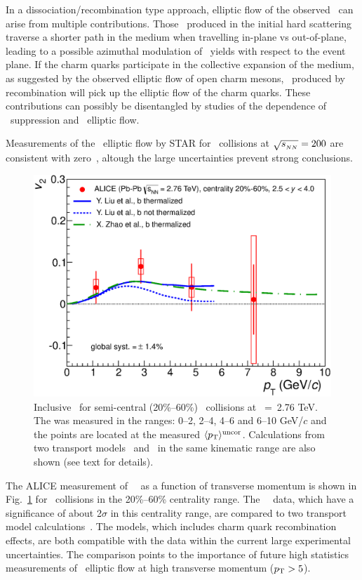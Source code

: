 In a dissociation/recombination type approach, elliptic flow of the observed \jpsi\ can arise from multiple 
contributions. Those \jpsi\ produced in the initial hard scattering traverse a shorter path in the medium when 
travelling in-plane vs out-of-plane, leading to a possible azimuthal modulation of \jpsi\ yields with respect
to the event plane. If the charm quarks participate in the collective expansion of the medium, as 
suggested by the observed elliptic flow of open charm mesons, \jpsi\ produced by recombination will 
pick up the elliptic flow of the charm quarks. These contributions can possibly be disentangled by 
studies of the \pt dependence of \jpsi\ suppression and \jpsi\ elliptic flow.

Measurements of the \jpsi\ elliptic flow by STAR for \AuAu\ collisions at $\sqrt{s_{_{NN}}} = 200$\GeV 
are consistent with zero~\cite{Adamczyk:2012pw}, altough the large uncertainties prevent strong conclusions.

\begin{figure}
\includegraphics[width=0.49\linewidth]{qqbarfigures/prl_fig4.eps}
\caption{\label{fig:GR:v2ptcomp} Inclusive \jpsi\ \vpt  for semi-central (20\%--60\%) \PbPb\ collisions at \rootsNN~=~2.76 TeV. The \vtwo was measured in the \pt ranges: 0--2, 2--4, 4--6 and 6--10 GeV/$c$ and the points are located at the measured  $\langle p_{\rm T} \rangle^{\rm uncor}$. Calculations from two transport models~\cite{Liu:2009gx} and~\cite{Zhao:2012gc} in the same kinematic range are also shown (see text for details).}
\end{figure}

The ALICE measurement of \jpsi\ \vtwo\ as a function of transverse momentum is shown in Fig.~\ref{fig:GR:v2ptcomp} for \PbPb\ collisions
in the 20\%--60\% centrality range.
The \jpsi\ \vtwo\ data, which have a significance of about 2$\sigma$ in this centrality range, are compared to two 
transport model calculations~\cite{Liu:2009gx,Zhao:2012gc}. The models, which includes charm quark recombination effects, 
are both compatible with the data within the current large experimental uncertainties. The comparison points to the 
importance of future high statistics measurements of \jpsi\ elliptic flow at high transverse momentum ($p_{\rm{T}} > 5$\GeVc).

